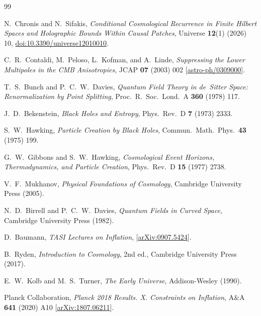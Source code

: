 \documentclass[a4paper,11pt]{article}
\begin{document}
\begin{thebibliography}{99}

N.~Chronis and N.~Sifakis,
\textit{Conditional Cosmological Recurrence in Finite Hilbert Spaces and Holographic Bounds Within Causal Patches},
Universe \textbf{12}(1) (2026) 10,
\href{https://doi.org/10.3390/universe12010010}{doi:10.3390/universe12010010}.

C.~R.~Contaldi, M.~Peloso, L.~Kofman, and A.~Linde,
\textit{Suppressing the Lower Multipoles in the CMB Anisotropies},
JCAP \textbf{07} (2003) 002
[\href{https://arxiv.org/abs/astro-ph/0309000}{astro-ph/0309000}].

T.~S.~Bunch and P.~C.~W.~Davies,
\textit{Quantum Field Theory in de~Sitter Space: Renormalization by Point Splitting},
Proc.\ R.\ Soc.\ Lond.\ A \textbf{360} (1978) 117.

J.~D.~Bekenstein,
\textit{Black Holes and Entropy},
Phys.\ Rev.\ D \textbf{7} (1973) 2333.

S.~W.~Hawking,
\textit{Particle Creation by Black Holes},
Commun.\ Math.\ Phys.\ \textbf{43} (1975) 199.

G.~W.~Gibbons and S.~W.~Hawking,
\textit{Cosmological Event Horizons, Thermodynamics, and Particle Creation},
Phys.\ Rev.\ D \textbf{15} (1977) 2738.

V.~F.~Mukhanov,
\textit{Physical Foundations of Cosmology},
Cambridge University Press (2005).

N.~D.~Birrell and P.~C.~W.~Davies,
\textit{Quantum Fields in Curved Space},
Cambridge University Press (1982).

D.~Baumann,
\textit{TASI Lectures on Inflation},
[\href{https://arxiv.org/abs/0907.5424}{arXiv:0907.5424}].

B.~Ryden,
\textit{Introduction to Cosmology},
2nd ed., Cambridge University Press (2017).

E.~W.~Kolb and M.~S.~Turner,
\textit{The Early Universe},
Addison-Wesley (1990).

Planck Collaboration,
\textit{Planck 2018 Results. X. Constraints on Inflation},
A\&A \textbf{641} (2020) A10
[\href{https://arxiv.org/abs/1807.06211}{arXiv:1807.06211}].


\end{thebibliography}
\end{document}
